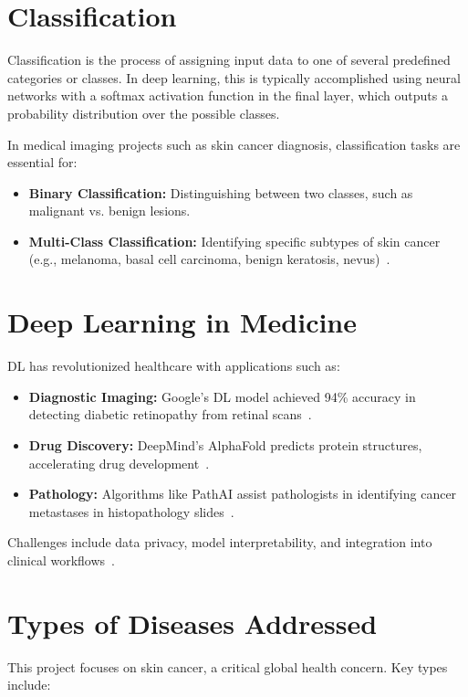 \documentclass[a4paper,12pt]{report}
\begin{document}
\begin{spacing}{1.5}
    \section{Classification}
    Classification is the process of assigning input data to one of several predefined categories or classes. In deep learning, this is typically accomplished using neural networks with a softmax activation function in the final layer, which outputs a probability distribution over the possible classes.

    In medical imaging projects such as skin cancer diagnosis, classification tasks are essential for:
    \begin{itemize}
        \item \textbf{Binary Classification:} Distinguishing between two classes, such as malignant vs. benign lesions.
        \item \textbf{Multi-Class Classification:} Identifying specific subtypes of skin cancer (e.g., melanoma, basal cell carcinoma, benign keratosis, nevus)~\cite{dl6}.
    \end{itemize}

    \section{Deep Learning in Medicine}
    DL has revolutionized healthcare with applications such as:

    \begin{itemize}
        \item \textbf{Diagnostic Imaging:} Google’s DL model achieved 94\% accuracy in detecting diabetic retinopathy from retinal scans~\cite{dl8}.
        \item \textbf{Drug Discovery:} DeepMind’s AlphaFold predicts protein structures, accelerating drug development~\cite{dl9}.
        \item \textbf{Pathology:} Algorithms like PathAI assist pathologists in identifying cancer metastases in histopathology slides~\cite{dl10}.
    \end{itemize}
    Challenges include data privacy, model interpretability, and integration into clinical workflows~\cite{dl11}.
    
    \section{Types of Diseases Addressed}
    This project focuses on skin cancer, a critical global health concern. Key types include:
    

\end{spacing}
\end{document}
